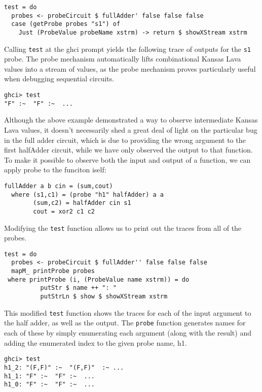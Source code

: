 \documentclass{llncs}
\begin{document}
\begin{verbatim}
test = do
  probes <- probeCircuit $ fullAdder' false false false
  case (getProbe probes "s1") of
    Just (ProbeValue probeName xstrm) -> return $ showXStream xstrm
\end{verbatim}

Calling \verb!test! at the ghci prompt yields the following trace of outputs for
the \texttt{s1} probe. The probe mechanism automatically lifts combinational Kansas Lava
values into a stream of values, as the probe mechanism proves particularly
useful when debugging sequential circuits.

\begin{verbatim}
ghci> test
"F" :~  "F" :~  ...
\end{verbatim}

Although the above example demonstrated a way to observe intermediate Kansas
Lava values, it doesn't necessarily shed a great deal of light on the particular
bug in the full adder circuit, which is due to providing the wrong argument to
the first halfAdder circuit, while we have only observed the output to that
function. To make it possible to observe both the input and output of a
function, we can apply probe to the funciton iself:

\begin{verbatim}
fullAdder a b cin = (sum,cout)
  where (s1,c1) = (probe "h1" halfAdder) a a
        (sum,c2) = halfAdder cin s1
        cout = xor2 c1 c2
\end{verbatim}


Modifying the \verb!test! function allows us to print out the traces from all of
the probes.

\begin{verbatim}
test = do
  probes <- probeCircuit $ fullAdder'' false false false
  mapM_ printProbe probes
 where printProbe (i, (ProbeValue name xstrm)) = do
          putStr $ name ++ ": "
          putStrLn $ show $ showXStream xstrm
\end{verbatim}

This modified \verb!test! function shows the traces for each of the input
argument to the half adder, as well as the output. The \verb!probe! function
generates names for each of these by simply enumerating each argument (along
with the result) and adding the enumerated index to the given probe name, h1.

\begin{verbatim}
ghci> test
h1_2: "(F,F)" :~  "(F,F)"  :~ ...
h1_1: "F" :~  "F" :~  ...
h1_0: "F" :~  "F" :~  ...
\end{verbatim}
\end{document}
